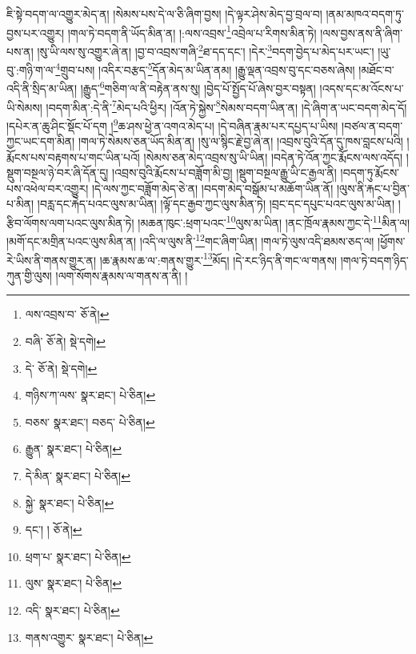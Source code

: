 ཇི་སྟེ་བདག་ལ་འགྱུར་མེད་ན། །སེམས་པས་དེ་ལ་ཅི་ཞིག་བྱས། །དེ་ལྟར་ཤེས་མེད་བྱ་བྲལ་བ། །ནམ་མཁའ་བདག་ཏུ་བྱས་པར་འགྱུར། །གལ་ཏེ་བདག་ནི་ཡོད་མིན་ན། །:ལས་འབྲས་\footnote{ལས་འབྲས་བ་  ཅོ་ནེ། }འབྲེལ་པ་རིགས་མིན་ཏེ། །ལས་བྱས་ནས་ནི་ཞིག་པས་ན། །སུ་ཡི་ལས་སུ་འགྱུར་ཞེ་ན། །བྱ་བ་འབྲས་གཞི་\footnote{བཞི་  ཅོ་ནེ།  སྡེ་དགེ། }ཐ་དད་དང་། །དེར་\footnote{དེ་  ཅོ་ནེ།  སྡེ་དགེ། }བདག་བྱེད་པ་མེད་པར་ཡང་། །ཡུ་བུ་:གཉི་ག་ལ་\footnote{གཉིས་ཀ་ལས་  སྣར་ཐང་།  པེ་ཅིན། }གྲུབ་པས། །འདིར་བརྩད་\footnote{བཅས་  སྣར་ཐང་། བཅད་  པེ་ཅིན། }དོན་མེད་མ་ཡིན་ནམ། །རྒྱུ་ལྡན་འབྲས་བུ་དང་བཅས་ཞེས། །མཐོང་བ་འདི་ནི་སྲིད་མ་ཡིན། །རྒྱུད་\footnote{རྒྱུན་  སྣར་ཐང་།  པེ་ཅིན། }གཅིག་ལ་ནི་བརྟེན་ནས་སུ། །བྱེད་པོ་སྤྱོད་པོ་ཞེས་བྱར་བསྟན། །འདས་དང་མ་འོངས་པ་ཡི་སེམས། །བདག་མིན་:དེ་ནི་\footnote{དེ་མིན་  སྣར་ཐང་།  པེ་ཅིན། }མེད་པའི་ཕྱིར། །འོན་ཏེ་སྐྱེས་\footnote{སྐྱེ་  སྣར་ཐང་།  པེ་ཅིན། }སེམས་བདག་ཡིན་ན། །དེ་ཞིག་ན་ཡང་བདག་མེད་དོ། །དཔེར་ན་ཆུ་ཤིང་སྡོང་པོ་དག །\footnote{དང་། །  ཅོ་ནེ། }ཆ་ཤས་ཕྱེ་ན་འགའ་མེད་པ། །དེ་བཞིན་རྣམ་པར་དཔྱད་པ་ཡིས། །བཙལ་ན་བདག་ཀྱང་ཡང་དག་མིན། །གལ་ཏེ་སེམས་ཅན་ཡོད་མིན་ན། །སུ་ལ་སྙིང་རྗེ་བྱ་ཞེ་ན། །འབྲས་བུའི་དོན་དུ་ཁས་བླངས་པའི། །རྨོངས་པས་བརྟགས་པ་གང་ཡིན་པའོ། །སེམས་ཅན་མེད་འབྲས་སུ་ཡི་ཡིན། །བདེན་ཏེ་འོན་ཀྱང་རྨོངས་ལས་འདོད། །སྡུག་བསྔལ་ཉེ་བར་ཞི་དོན་དུ། །འབྲས་བུའི་རྨོངས་པ་བཟློག་མི་བྱ། །སྡུག་བསྔལ་རྒྱུ་ཡི་ང་རྒྱལ་ནི། །བདག་ཏུ་རྨོངས་པས་འཕེལ་བར་འགྱུར། །དེ་ལས་ཀྱང་བཟློག་མེད་ཅེ་ན། །བདག་མེད་བསྒོམ་པ་མཆོག་ཡིན་ནོ། །ལུས་ནི་རྐང་པ་བྱིན་པ་མིན། །བརླ་དང་རྐེད་པའང་ལུས་མ་ཡིན། །ལྟོ་དང་རྒྱབ་ཀྱང་ལུས་མིན་ཏེ། །བྲང་དང་དཔུང་པའང་ལུས་མ་ཡིན། །རྩིབ་ལོགས་ལག་པའང་ལུས་མིན་ཏེ། །མཆན་ཁུང་:ཕྲག་པའང་\footnote{ཕྲག་པ་  སྣར་ཐང་།  པེ་ཅིན། }ལུས་མ་ཡིན། །ནང་ཁྲོལ་རྣམས་ཀྱང་དེ་\footnote{ལུས་  སྣར་ཐང་།  པེ་ཅིན། }མིན་ལ། །མགོ་དང་མགྲིན་པའང་ལུས་མིན་ན། །འདི་ལ་ལུས་ནི་\footnote{འདི་  སྣར་ཐང་།  པེ་ཅིན། }གང་ཞིག་ཡིན། །གལ་ཏེ་ལུས་འདི་ཐམས་ཅད་ལ། །ཕྱོགས་རེ་ཡིས་ནི་གནས་གྱུར་ན། །ཆ་རྣམས་ཆ་ལ་:གནས་གྱུར་\footnote{གནས་འགྱུར་  སྣར་ཐང་།  པེ་ཅིན། }མོད། །དེ་རང་ཉིད་ནི་གང་ལ་གནས། །གལ་ཏེ་བདག་ཉིད་ཀུན་གྱི་ལུས། །ལག་སོགས་རྣམས་ལ་གནས་ན་ནི། །
